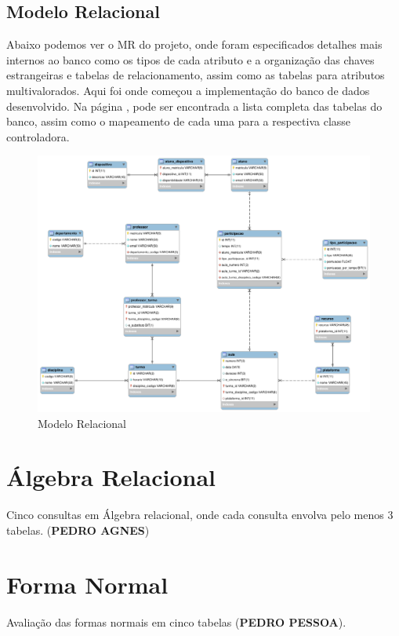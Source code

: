 \documentclass[12pt]{article}
\begin{document}
\newpage

\subsection*{Modelo Relacional}
Abaixo podemos ver o MR do projeto, onde foram especificados detalhes mais internos ao banco como os tipos de cada atributo e a organização das chaves estrangeiras e tabelas de relacionamento, assim como as tabelas para atributos multivalorados. Aqui foi onde começou a implementação do banco de dados desenvolvido. Na página \pageref{mapeamento-controller}, pode ser encontrada a lista completa das tabelas do banco, assim como o mapeamento de cada uma para a respectiva classe controladora.

\begin{figure}[H]
	\centering
    \includegraphics[width=1\textwidth]{MR.png}
    \caption{Modelo Relacional}
\end{figure}

\section*{Álgebra Relacional}
Cinco consultas em Álgebra relacional, onde cada consulta envolva pelo menos 3 tabelas. (\textbf{PEDRO AGNES})

\section*{Forma Normal}
Avaliação das formas normais em cinco tabelas (\textbf{PEDRO PESSOA}).
\end{document}
